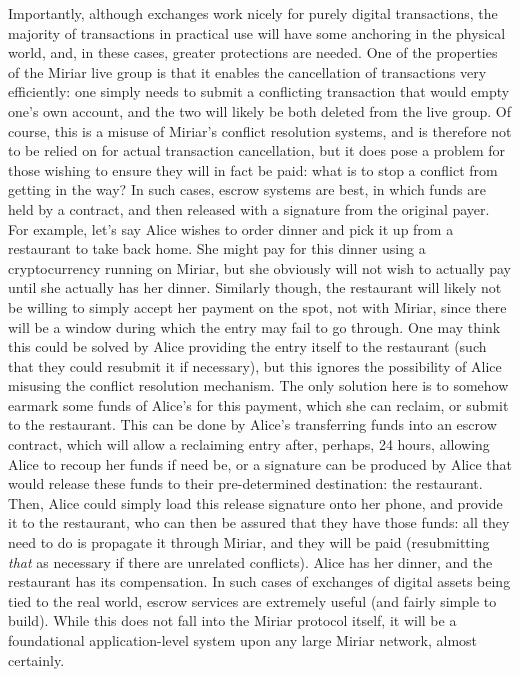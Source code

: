 \documentclass{extreport}
\begin{document}
Importantly, although exchanges work nicely for purely digital transactions, the majority of transactions in practical use will have some anchoring in the physical world, and, in these cases, greater protections are needed. One of the properties of the Miriar live group is that it enables the cancellation of transactions very efficiently: one simply needs to submit a conflicting transaction that would empty one's own account, and the two will likely be both deleted from the live group. Of course, this is a misuse of Miriar's conflict resolution systems, and is therefore not to be relied on for actual transaction cancellation, but it does pose a problem for those wishing to ensure they will in fact be paid: what is to stop a conflict from getting in the way? In such cases, escrow systems are best, in which funds are held by a contract, and then released with a signature from the original payer. For example, let's say Alice wishes to order dinner and pick it up from a restaurant to take back home. She might pay for this dinner using a cryptocurrency running on Miriar, but she obviously will not wish to actually pay until she actually has her dinner. Similarly though, the restaurant will likely not be willing to simply accept her payment on the spot, not with Miriar, since there will be a window during which the entry may fail to go through. One may think this could be solved by Alice providing the entry itself to the restaurant (such that they could resubmit it if necessary), but this ignores the possibility of Alice misusing the conflict resolution mechanism. The only solution here is to somehow earmark some funds of Alice's for this payment, which she can reclaim, or submit to the restaurant. This can be done by Alice's transferring funds into an escrow contract, which will allow a reclaiming entry after, perhaps, 24 hours, allowing Alice to recoup her funds if need be, or a signature can be produced by Alice that would release these funds to their pre-determined destination: the restaurant. Then, Alice could simply load this release signature onto her phone, and provide it to the restaurant, who can then be assured that they have those funds: all they need to do is propagate it through Miriar, and they will be paid (resubmitting \emph{that} as necessary if there are unrelated conflicts). Alice has her dinner, and the restaurant has its compensation. In such cases of exchanges of digital assets being tied to the real world, escrow services are extremely useful (and fairly simple to build). While this does not fall into the Miriar protocol itself, it will be a foundational application-level system upon any large Miriar network, almost certainly.
\end{document}
